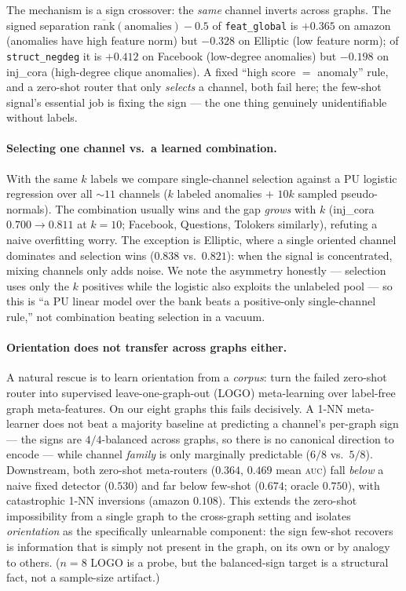 \documentclass[11pt]{article}
\newcommand{\auc}{\textsc{auc}}
\begin{document}
The mechanism is a sign crossover: the \emph{same} channel inverts across graphs. The signed
separation $\overline{\text{rank}}(\text{anomalies})-0.5$ of \texttt{feat\_global} is $+0.365$
on amazon (anomalies have high feature norm) but $-0.328$ on Elliptic (low feature norm); of
\texttt{struct\_negdeg} it is $+0.412$ on Facebook (low-degree anomalies) but $-0.198$ on
inj\_cora (high-degree clique anomalies). A fixed ``high score $=$ anomaly'' rule, and a
zero-shot router that only \emph{selects} a channel, both fail here; the few-shot signal's
essential job is fixing the sign --- the one thing genuinely unidentifiable without labels.

\paragraph{Selecting one channel vs.\ a learned combination.} With the same $k$ labels we
compare single-channel selection against a PU logistic regression over all ${\sim}11$ channels
($k$ labeled anomalies $+$ $10k$ sampled pseudo-normals). The combination usually wins and the
gap \emph{grows} with $k$ (inj\_cora $0.700\!\rightarrow\!0.811$ at $k{=}10$; Facebook,
Questions, Tolokers similarly), refuting a naive overfitting worry. The exception is Elliptic,
where a single oriented channel dominates and selection wins ($0.838$ vs.\ $0.821$): when the
signal is concentrated, mixing channels only adds noise. We note the asymmetry honestly ---
selection uses only the $k$ positives while the logistic also exploits the unlabeled pool ---
so this is ``a PU linear model over the bank beats a positive-only single-channel rule,'' not
combination beating selection in a vacuum.

\paragraph{Orientation does not transfer across graphs either.} A natural rescue is to learn
orientation from a \emph{corpus}: turn the failed zero-shot router into supervised
leave-one-graph-out (LOGO) meta-learning over label-free graph meta-features. On our eight
graphs this fails decisively. A 1-NN meta-learner does not beat a majority baseline at
predicting a channel's per-graph sign --- the signs are $4/4$-balanced across graphs, so there
is no canonical direction to encode --- while channel \emph{family} is only marginally
predictable ($6/8$ vs.\ $5/8$). Downstream, both zero-shot meta-routers ($0.364$, $0.469$ mean
\auc{}) fall \emph{below} a naive fixed detector ($0.530$) and far below few-shot ($0.674$;
oracle $0.750$), with catastrophic 1-NN inversions (amazon $0.108$). This extends the zero-shot
impossibility from a single graph to the cross-graph setting and isolates \emph{orientation} as
the specifically unlearnable component: the sign few-shot recovers is information that is simply
not present in the graph, on its own or by analogy to others. ($n{=}8$ LOGO is a probe, but the
balanced-sign target is a structural fact, not a sample-size artifact.)
\end{document}

